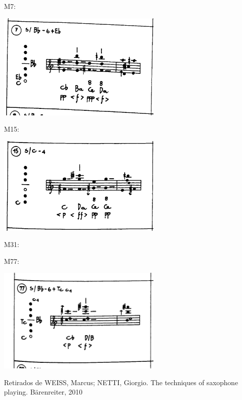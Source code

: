 \documentclass[article,12pt,openany,oneside,a4paper,chapter=TITLE,hyphen,english,brazil,chapter=TITLE,sumario=tradicional]{abntex2}
\begin{document}
M7:

\begin{center}
\includegraphics[width=8cm]{images/multi7.png}
\end{center}

M15:

\begin{center}
\includegraphics[width=8cm]{images/multi15.png}
\end{center}

M31:

M77:

\begin{center}
\includegraphics[width=8cm]{images/multi77.png}
\end{center}

Retirados de WEISS, Marcus; NETTI, Giorgio. The techniques of saxophone playing. Bärenreiter, 2010
\end{document}
